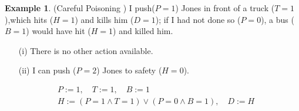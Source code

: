 \documentclass[11pt,a4paper]{book}
\theoremstyle{definition}
\theoremstyle{definition}
\newtheorem{example}{Example}[section]
\theoremstyle{definition}
\theoremstyle{remark}
\begin{document}
\begin{example}(Careful Poisoning \cite{Weslake2015partialtheory})
I push($P=1$) Jones in front of a truck ($T=1$),which hits ($H=1$) and kills him ($D=1$); if I had not done so ($P=0$), a bus ($B=1$) would have hit ($H=1$) and killed him.
\begin{itemize}
\item[(i)] There is no other action available.
\item[(ii)] I can push ($P = 2$) Jones to safety ($H = 0$).
\end{itemize}

\begin{equation*}
\begin{split}
&P:=1, \quad T:=1, \quad B:=1\\
&H:=(P=1 \land T=1) \lor (P=0 \land B=1), \quad D:=H
\end{split}
\end{equation*}
\begin{center}
\end{center}
\end{example}
\end{document}
